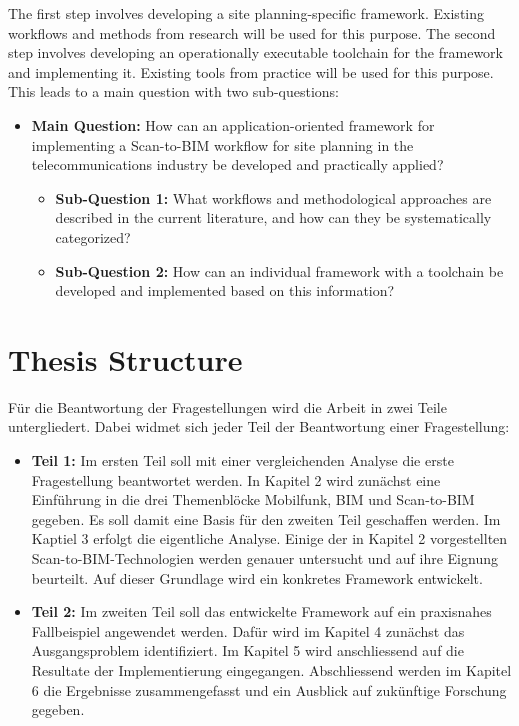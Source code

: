 \begin{English}
    The first step involves developing a site planning-specific framework. Existing workflows and methods from research will be used for this purpose. The second step involves developing an operationally executable toolchain for the framework and implementing it. Existing tools from practice will be used for this purpose. This leads to a main question with two sub-questions:

    \begin{itemize}
        \item \textbf{Main Question:} How can an application-oriented framework for implementing a Scan-to-BIM workflow for site planning in the telecommunications industry be developed and practically applied?
        \begin{itemize}
            \item \textbf{Sub-Question 1:} What workflows and methodological approaches are described in the current literature, and how can they be systematically categorized?
            \item \textbf{Sub-Question 2:} How can an individual framework with a toolchain be developed and implemented based on this information?
        \end{itemize}
    \end{itemize}
\end{English}

\section{Thesis Structure}
\begin{German}
    Für die Beantwortung der Fragestellungen wird die Arbeit in zwei Teile untergliedert. Dabei widmet sich jeder Teil der Beantwortung einer Fragestellung:

    \begin{itemize}
        \item \textbf{Teil 1:} Im ersten Teil soll mit einer vergleichenden Analyse die erste Fragestellung beantwortet werden. In Kapitel 2 wird zunächst eine Einführung in die drei Themenblöcke Mobilfunk, BIM und Scan-to-BIM gegeben. Es soll damit eine Basis für den zweiten Teil geschaffen werden. Im Kaptiel 3 erfolgt die eigentliche Analyse. Einige der in Kapitel 2 vorgestellten Scan-to-BIM-Technologien werden genauer untersucht und auf ihre Eignung beurteilt. Auf dieser Grundlage wird ein konkretes Framework entwickelt.
        \item \textbf{Teil 2:} Im zweiten Teil soll das entwickelte Framework auf ein praxisnahes Fallbeispiel angewendet werden. Dafür wird im Kapitel 4 zunächst das Ausgangsproblem identifiziert. Im Kapitel 5 wird anschliessend auf die Resultate der Implementierung eingegangen. Abschliessend werden im Kapitel 6 die Ergebnisse zusammengefasst und ein Ausblick auf zukünftige Forschung gegeben.
    \end{itemize} 
\end{German}

